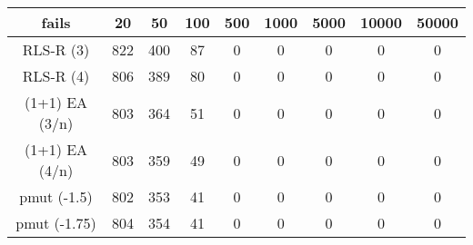 \begin{tabular}[h]{ccccccccc}
fails&20&50&100&500&1000&5000&10000&50000\\\hline
RLS-R (3)&822&400&87&0&0&0&0&0\\
RLS-R (4)&806&389&80&0&0&0&0&0\\
(1+1) EA (3/n)&803&364&51&0&0&0&0&0\\
(1+1) EA (4/n)&803&359&49&0&0&0&0&0\\
pmut (-1.5)&802&353&41&0&0&0&0&0\\
pmut (-1.75)&804&354&41&0&0&0&0&0\\
\end{tabular}
